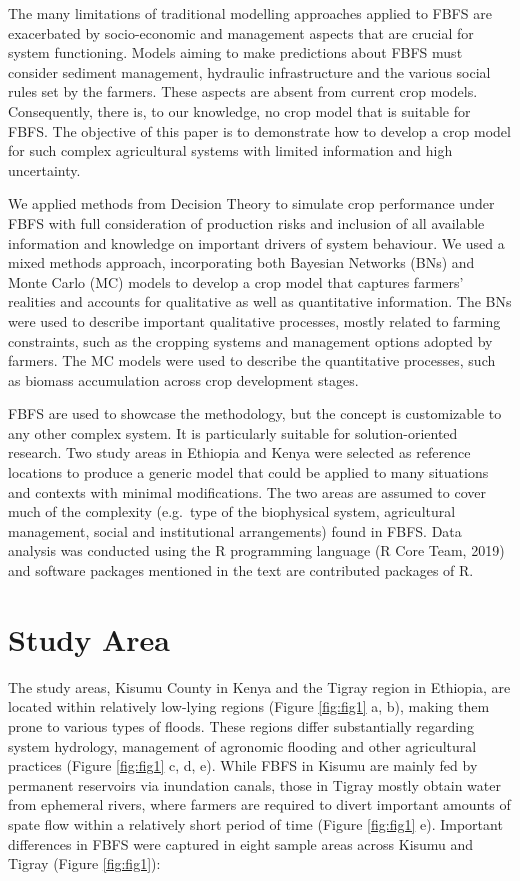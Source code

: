 \documentclass[]{elsarticle} %
\begin{document}
The many limitations of traditional modelling approaches applied to FBFS are exacerbated by socio-economic and management aspects that are crucial for system functioning. Models aiming to make predictions about FBFS must consider sediment management, hydraulic infrastructure and the various social rules set by the farmers. These aspects are absent from current crop models. Consequently, there is, to our knowledge, no crop model that is suitable for FBFS. The objective of this paper is to demonstrate how to develop a crop model for such complex agricultural systems with limited information and high uncertainty.

We applied methods from Decision Theory to simulate crop performance under FBFS with full consideration of production risks and inclusion of all available information and knowledge on important drivers of system behaviour. We used a mixed methods approach, incorporating both Bayesian Networks (BNs) and Monte Carlo (MC) models to develop a crop model that captures farmers' realities and accounts for qualitative as well as quantitative information. The BNs were used to describe important qualitative processes, mostly related to farming constraints, such as the cropping systems and management options adopted by farmers. The MC models were used to describe the quantitative processes, such as biomass accumulation across crop development stages.

FBFS are used to showcase the methodology, but the concept is customizable to any other complex system. It is particularly suitable for solution-oriented research. Two study areas in Ethiopia and Kenya were selected as reference locations to produce a generic model that could be applied to many situations and contexts with minimal modifications. The two areas are assumed to cover much of the complexity (e.g.~type of the biophysical system, agricultural management, social and institutional arrangements) found in FBFS. Data analysis was conducted using the R programming language (R Core Team, 2019) and software packages mentioned in the text are contributed packages of R.

\hypertarget{ref2}{%
\section{Study Area}\label{ref2}}

The study areas, Kisumu County in Kenya and the Tigray region in Ethiopia, are located within relatively low-lying regions (Figure \ref{fig:fig1} a, b), making them prone to various types of floods. These regions differ substantially regarding system hydrology, management of agronomic flooding and other agricultural practices (Figure \ref{fig:fig1} c, d, e). While FBFS in Kisumu are mainly fed by permanent reservoirs via inundation canals, those in Tigray mostly obtain water from ephemeral rivers, where farmers are required to divert important amounts of spate flow within a relatively short period of time (Figure \ref{fig:fig1} e). Important differences in FBFS were captured in eight sample areas across Kisumu and Tigray (Figure \ref{fig:fig1}):
\end{document}
